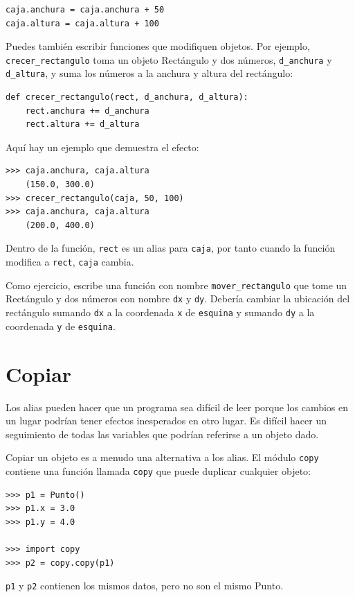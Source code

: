 \documentclass[10pt]{book}
\begin{document}
\begin{verbatim}
caja.anchura = caja.anchura + 50
caja.altura = caja.altura + 100
\end{verbatim}
%
Puedes también escribir funciones que modifiquen objetos.  Por ejemplo,
\verb"crecer_rectangulo" toma un objeto Rectángulo y dos números,
{\tt d\_anchura} y {\tt d\_altura}, y suma los números a la
anchura y altura del rectángulo:

\begin{verbatim}
def crecer_rectangulo(rect, d_anchura, d_altura):
    rect.anchura += d_anchura
    rect.altura += d_altura
\end{verbatim}
%
Aquí hay un ejemplo que demuestra el efecto:

\begin{verbatim}
>>> caja.anchura, caja.altura
    (150.0, 300.0)
>>> crecer_rectangulo(caja, 50, 100)
>>> caja.anchura, caja.altura
    (200.0, 400.0)
\end{verbatim}
%
Dentro de la función, {\tt rect} es un
alias para {\tt caja}, por tanto cuando la función modifica a {\tt rect},
{\tt caja} cambia.

Como ejercicio, escribe una función con nombre \verb"mover_rectangulo" que tome
un Rectángulo y dos números con nombre {\tt dx} y {\tt dy}.  Debería
cambiar la ubicación del rectángulo sumando {\tt dx}
a la coordenada {\tt x} de {\tt esquina} y sumando {\tt dy}
a la coordenada {\tt y} de {\tt esquina}.


\section{Copiar}
\label{copying}

Los alias pueden hacer que un programa sea difícil de leer porque los cambios
en un lugar podrían tener efectos inesperados en otro lugar.
Es difícil hacer un seguimiento de todas las variables que podrían referirse
a un objeto dado.

Copiar un objeto es a menudo una alternativa a los alias.
El módulo {\tt copy} contiene una función llamada {\tt copy} que
puede duplicar cualquier objeto:

\begin{verbatim}
>>> p1 = Punto()
>>> p1.x = 3.0
>>> p1.y = 4.0

>>> import copy
>>> p2 = copy.copy(p1)
\end{verbatim}
%
{\tt p1} y {\tt p2} contienen los mismos datos, pero no son
el mismo Punto.
\end{document}
